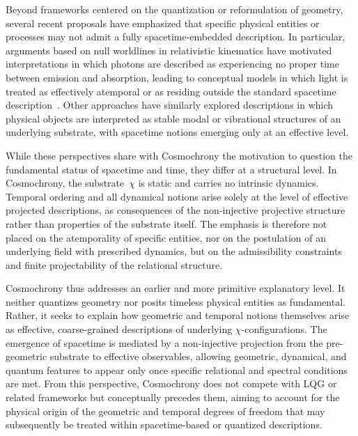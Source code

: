   Beyond frameworks centered on the quantization or reformulation of geometry,
  several recent proposals have emphasized that specific physical entities or
  processes may not admit a fully spacetime-embedded description.
  In particular, arguments based on null worldlines in relativistic kinematics
  have motivated interpretations in which photons are described as experiencing
  no proper time between emission and absorption, leading to conceptual models in
  which light is treated as effectively atemporal or as residing outside the
  standard spacetime description~\cite{McKinley2025}.
  Other approaches have similarly explored descriptions in which physical objects
  are interpreted as stable modal or vibrational structures of an underlying
  substrate, with spacetime notions emerging only at an effective level.

  While these perspectives share with Cosmochrony the motivation to question the
  fundamental status of spacetime and time, they differ at a structural level.
  In Cosmochrony, the substrate~$\chi$ is static and carries no intrinsic
  dynamics.
  Temporal ordering and all dynamical notions arise solely at the level of
  effective projected descriptions, as consequences of the non-injective
  projective structure rather than properties of the substrate itself.
  The emphasis is therefore not placed on the atemporality of specific entities,
  nor on the postulation of an underlying field with prescribed dynamics, but on
  the admissibility constraints and finite projectability of the relational
  structure.

  Cosmochrony thus addresses an earlier and more primitive explanatory level.
  It neither quantizes geometry nor posits timeless physical entities as
  fundamental.
  Rather, it seeks to explain how geometric and temporal notions themselves arise
  as effective, coarse-grained descriptions of underlying $\chi$-configurations.
  The emergence of spacetime is mediated by a non-injective projection from the
  pre-geometric substrate to effective observables, allowing geometric,
  dynamical, and quantum features to appear only once specific relational and
  spectral conditions are met.
  From this perspective, Cosmochrony does not compete with LQG or related
  frameworks but conceptually precedes them, aiming to account for the physical
  origin of the geometric and temporal degrees of freedom that may subsequently
  be treated within spacetime-based or quantized descriptions.
